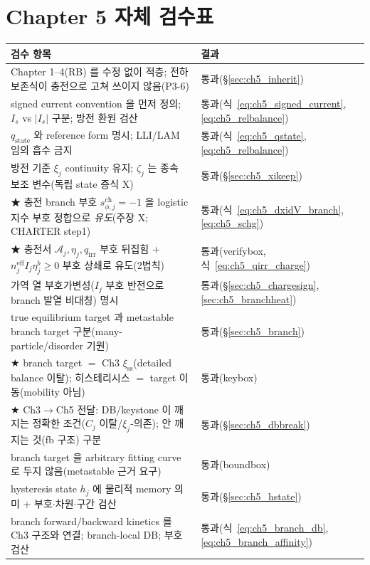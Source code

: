 \documentclass[11pt,a4paper]{article}
\newcommand{\eff}{\mathrm{eff}}
\newcommand{\irr}{\mathrm{irr}}
\newcommand{\chg}{\mathrm{ch}}
\newcommand{\stt}{\mathrm{state}}
\newcommand{\sstat}{\mathrm{ss}}
\begin{document}
\section{Chapter 5 자체 검수표}\label{sec:ch5_selfcheck}
{\small
\begin{longtable}{>{\raggedright\arraybackslash}p{} >{\raggedright\arraybackslash}p{}}
\toprule 검수 항목 & 결과 \\ \midrule \endhead
Chapter 1--4(RB) 를 수정 없이 적층; 전하 보존식이 충전으로 고쳐 쓰이지 않음(P3-6) & 통과(\S\ref{sec:ch5_inherit}) \\
signed current convention 을 먼저 정의; $I_s$ vs $|I_s|$ 구분; 방전 환원 검산 & 통과(식~\eqref{eq:ch5_signed_current},\allowbreak\eqref{eq:ch5_relbalance}) \\
$q_\stt$ 와 reference form 명시; LLI/LAM 임의 흡수 금지 & 통과(식~\eqref{eq:ch5_qstate},\allowbreak\eqref{eq:ch5_relbalance}) \\
방전 기준 $\xi_j$ continuity 유지; $\zeta_j$ 는 종속 보조 변수(독립 state 증식 X) & 통과(\S\ref{sec:ch5_xikeep}) \\
★ 충전 branch 부호 $s_{\phi,j}^\chg{=}-1$ 을 logistic 지수 부호 정합으로 \emph{유도}(주장 X; CHARTER step1) & 통과(식~\eqref{eq:ch5_dxidV_branch},\allowbreak\eqref{eq:ch5_schg}) \\
★ 충전서 $\mathcal A_j,\eta_j,q_\irr$ 부호 뒤집힘 + $n_j^\eff I_j\eta_j^b\ge0$ 부호 상쇄로 유도(2법칙) & 통과(verifybox,식~\eqref{eq:ch5_qirr_charge}) \\
가역 열 부호가변성($I_j$ 부호 반전으로 branch 발열 비대칭) 명시 & 통과(\S\ref{sec:ch5_chargesign},\ref{sec:ch5_branchheat}) \\
true equilibrium target 과 metastable branch target 구분(many-particle/disorder 기원) & 통과(\S\ref{sec:ch5_branch}) \\
★ branch target $=$ Ch3 $\xi_{\sstat}$(detailed balance 이탈); 히스테리시스 $=$ target 이동(mobility 아님) & 통과(keybox) \\
★ Ch3$\to$Ch5 전달: DB/keystone 이 깨지는 정확한 조건($C_j$ 이탈/$\xi_j$-의존); 안 깨지는 것(fb 구조) 구분 & 통과(\S\ref{sec:ch5_dbbreak}) \\
branch target 을 arbitrary fitting curve 로 두지 않음(metastable 근거 요구) & 통과(boundbox) \\
hysteresis state $h_j$ 에 물리적 memory 의미 + 부호$\cdot$차원$\cdot$구간 검산 & 통과(\S\ref{sec:ch5_hstate}) \\
branch forward/backward kinetics 를 Ch3 구조와 연결; branch-local DB; 부호 검산 & 통과(식~\eqref{eq:ch5_branch_db},\allowbreak\eqref{eq:ch5_branch_affinity}) \\

\end{longtable}}
\end{document}
